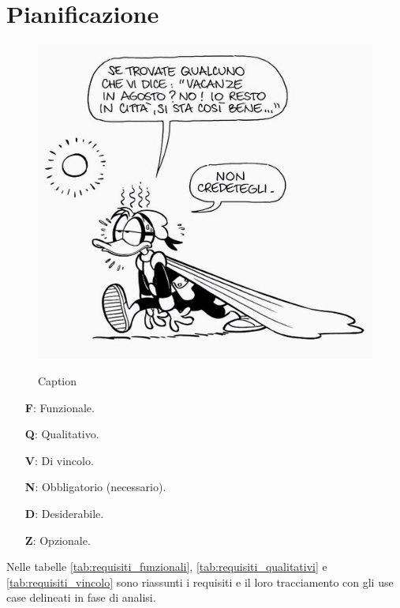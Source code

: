 \section{Pianificazione}
\begin{figure}[H]
    \centering
    \includegraphics[alt={Testo alternativo dell'immagine}, width=0.5\columnwidth]{img/pk_estate.jpeg}
    \caption{Caption}
    \label{fig:pk_estate_2}
\end{figure}
\lipsum[1]

\begin{enumerate}
    \item[\textbf{F}:] Funzionale.
    \item[\textbf{Q}:] Qualitativo.
    \item[\textbf{V}:] Di vincolo.
    \item[\textbf{N}:] Obbligatorio (necessario).
    \item[\textbf{D}:] Desiderabile.
    \item[\textbf{Z}:] Opzionale.
\end{enumerate}

Nelle tabelle \ref{tab:requisiti_funzionali}, \ref{tab:requisiti_qualitativi} e \ref{tab:requisiti_vincolo} sono riassunti i requisiti e il loro tracciamento con gli use case delineati in fase di analisi.

